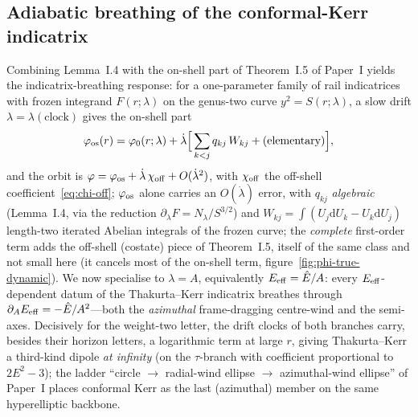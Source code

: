 \documentclass[12pt]{iopart}
\theoremstyle{plain}
\theoremstyle{definition}
\theoremstyle{remark}
\newcommand{\Ehat}{\hat E}
\newcommand{\dd}{\mathrm{d}}
\begin{document}
\subsection{Adiabatic breathing of the conformal-Kerr indicatrix}
\label{sec:unified}
Combining Lemma~I.4 with the on-shell part of Theorem~I.5 of Paper~I yields the
indicatrix-breathing response: for a one-parameter family
of rail indicatrices with frozen integrand $F(r;\lambda)$ on the genus-two curve
$y^2=S(r;\lambda)$, a slow drift $\lambda=\lambda(\text{clock})$ gives the on-shell part
\begin{equation}
    \varphi_{\rm os}(r)=\varphi_0(r;\lambda)+\dot\lambda\Big[\sum_{k<j} q_{kj}\,W_{kj}
    +(\text{elementary})\Big],
    \label{eq:unified}
\end{equation}
and the orbit is $\varphi=\varphi_{\rm os}+\dot\lambda\,\chi_{\rm off}+O(\dot\lambda^2)$, with
$\chi_{\rm off}$ the off-shell coefficient~\eqref{eq:chi-off}; $\varphi_{\rm os}$ alone carries an
$O(\dot\lambda)$ error,
with $q_{kj}$ \emph{algebraic} (Lemma~I.4, via the reduction $\partial_\lambda
F=N_\lambda/S^{3/2}$) and $W_{kj}=\int(U_j\dd U_k-U_k\dd U_j)$ length-two iterated Abelian
integrals of the frozen curve; the \emph{complete} first-order term adds the off-shell
(costate) piece of Theorem~I.5, itself of the same class and not small here (it cancels
most of the on-shell term, figure~\ref{fig:phi-true-dynamic}). We
now specialise to $\lambda=A$, equivalently $E_{\rm eff}=\Ehat/A$: every
$E_{\rm eff}$-dependent datum of the Thakurta--Kerr indicatrix breathes through
$\partial_A E_{\rm eff}=-\Ehat/A^2$---both the \emph{azimuthal} frame-dragging centre-wind
and the semi-axes. Decisively for the weight-two letter, the drift clocks of both
branches carry, besides their horizon letters, a logarithmic term at large $r$,
giving Thakurta--Kerr a third-kind dipole \emph{at infinity} (on the $\tau$-branch
with coefficient proportional to $2E^2-3$); the ladder ``circle $\to$ radial-wind ellipse $\to$ azimuthal-wind ellipse'' of
Paper~I places conformal Kerr as the last (azimuthal) member on the same hyperelliptic
backbone.
\end{document}
